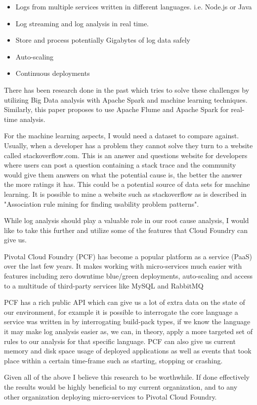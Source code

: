 \begin{itemize}
  \item Logs from multiple services written in different languages. i.e. Node.js or Java
  \item Log streaming and log analysis in real time. 
  \item Store and process potentially Gigabytes of log data safely
  \item Auto-scaling
  \item Continuous deployments
\end{itemize}

There has been research done in the past which tries to solve these challenges by utilizing Big Data analysis with Apache Spark and machine learning techniques\cite{8067504}. Similarly, this paper\cite{7748933} proposes to use Apache Flume and Apache Spark for real-time analysis.

For the machine learning aspects, I would need a dataset to compare against. Usually, when a developer has a problem they cannot solve they turn to a website called stackoverflow.com. This is an answer and questions website for developers where users can post a question containing a stack trace and the community would give them answers on what the potential cause is, the better the answer the more ratings it has. This could be a potential source of data sets for machine learning. It is possible to mine a website such as stackoverflow as is described in "Association rule mining for finding usability problem patterns"\cite{8320144}.

While log analysis should play a valuable role in our root cause analysis, I would like to take this further and utilize some of the features that Cloud Foundry can give us.

Pivotal Cloud Foundry (PCF) has become a popular platform as a service (PaaS) over the last few years\cite{6924673}. It makes working with micro-services much easier with features including zero downtime blue/green deployments, auto-scaling and access to a multitude of third-party services like MySQL and RabbitMQ

PCF has a rich public API which can give us a lot of extra data on the state of our environment, for example it is possible to interrogate the core language a service was written in by interrogating build-pack types, if we know the language it may make log analysis easier as, we can, in theory, apply a more targeted set of rules to our analysis for that specific language. PCF can also give us current memory and disk space usage of deployed applications as well as events that took place within a certain time-frame such as starting, stopping or crashing.

Given all of the above I believe this research to be worthwhile. If done effectively the results would be highly beneficial to my current organization, and to any other organization deploying micro-services to Pivotal Cloud Foundry.